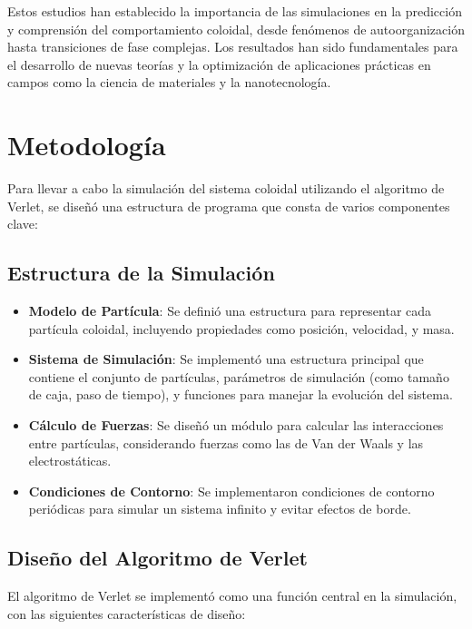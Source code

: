 \documentclass[twocolumn]{article}
\begin{document}
Estos estudios han establecido la importancia de las simulaciones en la predicción y comprensión del comportamiento coloidal, desde fenómenos de autoorganización hasta transiciones de fase complejas. Los resultados han sido fundamentales para el desarrollo de nuevas teorías y la optimización de aplicaciones prácticas en campos como la ciencia de materiales y la nanotecnología.

\section{Metodología}
Para llevar a cabo la simulación del sistema coloidal utilizando el algoritmo de Verlet, se diseñó una estructura de programa que consta de varios componentes clave:

\subsection*{Estructura de la Simulación}
\begin{itemize}
    \item \textbf{Modelo de Partícula}: Se definió una estructura para representar cada partícula coloidal, incluyendo propiedades como posición, velocidad, y masa.

    \item \textbf{Sistema de Simulación}: Se implementó una estructura principal que contiene el conjunto de partículas, parámetros de simulación (como tamaño de caja, paso de tiempo), y funciones para manejar la evolución del sistema.

    \item \textbf{Cálculo de Fuerzas}: Se diseñó un módulo para calcular las interacciones entre partículas, considerando fuerzas como las de Van der Waals y las electrostáticas.

    \item \textbf{Condiciones de Contorno}: Se implementaron condiciones de contorno periódicas para simular un sistema infinito y evitar efectos de borde.
\end{itemize}

\subsection*{Diseño del Algoritmo de Verlet}
El algoritmo de Verlet se implementó como una función central en la simulación, con las siguientes características de diseño:
\end{document}

